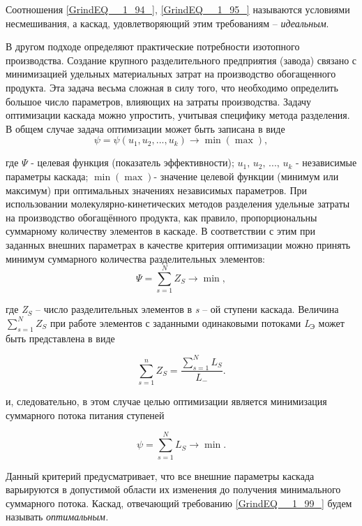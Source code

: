 Соотношения \ref{GrindEQ__1_94_}, \ref{GrindEQ__1_95_} называются условиями несмешивания, а каскад, удовлетворяющий этим требованиям -- \textit{идеальным}. 

В другом подходе определяют практические потребности изотопного производства. Создание крупного разделительного предприятия (завода) связано с минимизацией удельных материальных затрат на производство обогащенного продукта. Эта задача весьма сложная в силу того, что необходимо определить большое число параметров, влияющих на затраты производства. Задачу оптимизации каскада можно упростить, учитывая специфику метода разделения. В общем случае задача оптимизации может быть записана в виде
\begin{equation} \label{GrindEQ__1_96_} 
\psi =\psi (u_{1} ,u_{2} ,...,u_{k} )\to \min (\max ), 
\end{equation} 

где $\Psi $ - целевая функция (показатель эффективности); $u_{1} ,\, u_{2} ,\, ...,\, u_{k} $ - независимые параметры каскада; $\min (\max )$- значение целевой функции (минимум или максимум) при оптимальных значениях независимых параметров. При использовании молекулярно-кинетических методов разделения удельные затраты на производство обогащённого продукта, как правило, пропорциональны суммарному количеству элементов в каскаде. В соответствии с этим при заданных внешних параметрах в качестве критерия оптимизации можно принять минимум суммарного количества разделительных элементов:
\begin{equation} \label{GrindEQ__1_97_} 
\Psi =\sum _{s=1}^{N}Z_{S}  \to \min , 
\end{equation} 

где \textit{Z${}_{S}$} -- число разделительных элементов в \textit{s} -- ой ступени каскада. Величина $\sum _{s=1}^{N}Z_{S}  $ при работе элементов с заданными одинаковыми потоками \textit{L${}_{\textrm{Э}}$} может быть представлена в виде

\begin{equation} \label{GrindEQ__1_98_} 
\sum _{s=1}^{n}Z_{S} =\frac{\sum _{s=1}^{N}L_{S}  }{L_{-} }  .    
\end{equation} 

и, следовательно, в этом случае целью оптимизации является минимизация суммарного потока питания ступеней

\begin{equation} \label{GrindEQ__1_99_} 
\psi =\sum _{s=1}^{N}L_{S}  \to \min .    
\end{equation} 

Данный критерий предусматривает, что все внешние параметры каскада варьируются в допустимой области их изменения до получения минимального суммарного потока. Каскад, отвечающий требованию \ref{GrindEQ__1_99_} будем называть \textit{оптимальным.}







